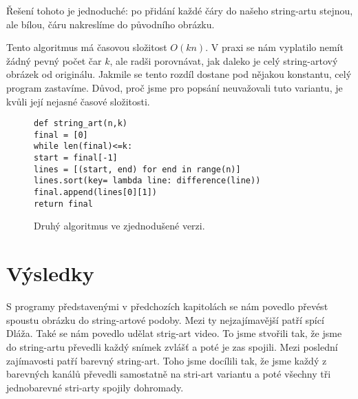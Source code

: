 \documentclass{article}
\begin{document}
Řešení tohoto je jednoduché: po přidání každé čáry do našeho string-artu stejnou,
ale bílou, čáru nakreslíme do původního obrázku.

Tento algoritmus má časovou složitost $O(kn)$. V praxi se nám vyplatilo nemít
žádný pevný počet čar $k$, ale radši porovnávat, jak daleko je celý string-artový obrázek od
originálu. Jakmile se tento rozdíl dostane pod nějakou konstantu, celý
program zastavíme. Důvod, proč jsme pro popsání neuvažovali tuto variantu, je kvůli její
nejasné časové složitosti. 

\begin{figure}
\label{fig:second}
\begin{mdframed}[style=MyFrame]
\begin{lstlisting}[style=metoo]
def string_art(n,k)
final = [0]
while len(final)<=k:
start = final[-1]
lines = [(start, end) for end in range(n)]
lines.sort(key= lambda line: difference(line))
final.append(lines[0][1])
return final
\end{lstlisting}
\end{mdframed}

\caption{Druhý algoritmus ve zjednodušené verzi.}
\end{figure}




\section{Výsledky}
\label{sec:vysledky}
S programy představenými v předchozích kapitolách se nám povedlo převést spoustu
obrázku do string-artové podoby. Mezi ty nejzajímavější patří spící Dláža. Také
se nám povedlo udělat strig-art video. To jsme stvořili tak, že jsme do
string-artu převedli každý snímek zvlášť a poté je zas spojili. Mezi poslední
zajímavosti patří barevný string-art. Toho jsme docílili tak, že jsme každý z
barevných kanálů převedli samostatně na stri-art variantu a poté všechny tři
jednobarevné stri-arty spojily dohromady.

\end{document}
